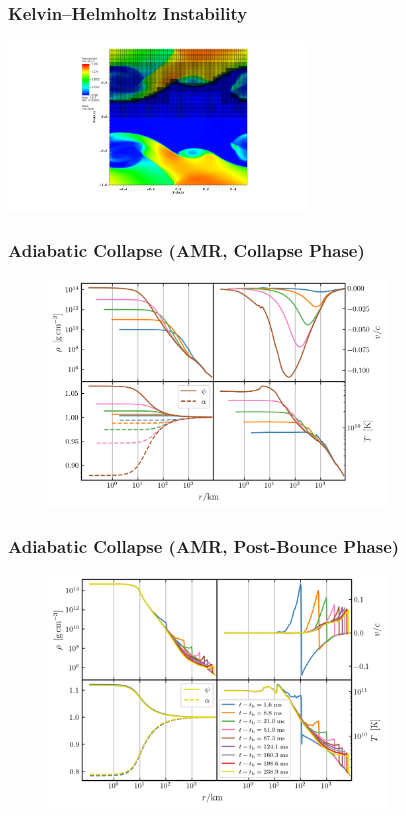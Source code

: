 \documentclass{beamer}
\begin{document}
\begin{frame}
\frametitle{Kelvin--Helmholtz Instability}

  \begin{center}
    {\includegraphics[width=0.6\textwidth]{fig.KHI.pdf}}
  \end{center}

\end{frame}

\begin{frame}
\frametitle{Adiabatic Collapse (AMR, Collapse Phase)}

  \begin{figure}[htb!]
    \centering
    \includegraphics[width=0.8\textwidth]{fig.collapse.png}
  \end{figure}

\end{frame}

\begin{frame}
\frametitle{Adiabatic Collapse (AMR, Post-Bounce Phase)}

  \begin{figure}[htb!]
    \centering
    \includegraphics[width=0.8\textwidth]{fig.postBounce.png}
  \end{figure}

\end{frame}
\end{document}
